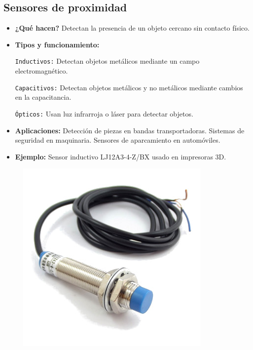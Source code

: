 \subsection*{Sensores de proximidad}
\begin{itemize}
	\item \textbf{¿Qué hacen?} Detectan la presencia de un objeto cercano sin contacto físico.
	\item \textbf{Tipos y funcionamiento:}
	
	\texttt{Inductivos:} Detectan objetos metálicos mediante un campo electromagnético.
	
	\texttt{Capacitivos:} Detectan objetos metálicos y no metálicos mediante cambios en la capacitancia.
	
	\texttt{Ópticos:} Usan luz infrarroja o láser para detectar objetos.
	\item \textbf{Aplicaciones:} Detección de piezas en bandas transportadoras.
	Sistemas de seguridad en maquinaria.
	Sensores de aparcamiento en automóviles.
	\item \textbf{Ejemplo:} Sensor inductivo LJ12A3-4-Z/BX usado en impresoras 3D.
\end{itemize}
\begin{figure}[h]
	\centering
	\includegraphics[width=0.3\linewidth]{img/sensor de proximidad}
	\label{fig:sensor de proximidad}
\end{figure}

